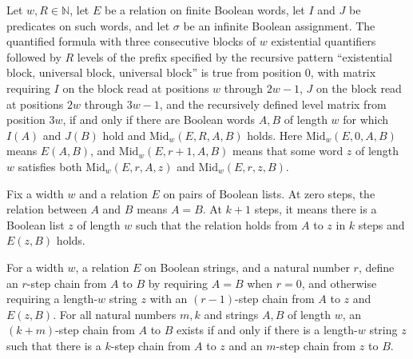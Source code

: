 \begin{theorem}
\label{Complexity.TQBFHard.prefixTruth_top}
\leanok
{}
Let $w,R\in\mathbb{N}$, let $E$ be a relation on finite Boolean words, let $I$ and $J$
be predicates on such words, and let $\sigma$ be an infinite Boolean assignment. The
quantified formula with three consecutive blocks of $w$ existential quantifiers followed
by $R$ levels of the prefix specified by the recursive pattern “existential block,
universal block, universal block” is true from position $0$, with matrix requiring $I$
on the block read at positions $w$ through $2w-1$, $J$ on the block read at positions
$2w$ through $3w-1$, and the recursively defined level matrix from position $3w$, if and
only if there are Boolean words $A,B$ of length $w$ for which $I(A)$ and $J(B)$ hold and
$\mathrm{Mid}_w(E,R,A,B)$ holds. Here $\mathrm{Mid}_w(E,0,A,B)$ means $E(A,B)$, and
$\mathrm{Mid}_w(E,r+1,A,B)$ means that some word $z$ of length $w$ satisfies both
$\mathrm{Mid}_w(E,r,A,z)$ and $\mathrm{Mid}_w(E,r,z,B)$.
\end{theorem}

\begin{definition}
\label{Complexity.TQBFHard.Steps}
\leanok
Fix a width $w$ and a relation $E$ on pairs of Boolean lists. At zero steps, the
relation between $A$ and $B$ means $A=B$. At $k+1$ steps, it means there is a Boolean
list $z$ of length $w$ such that the relation holds from $A$ to $z$ in $k$ steps and
$E(z,B)$ holds.
\end{definition}

\begin{theorem}
\label{Complexity.TQBFHard.steps_add}
\leanok
{}
For a width $w$, a relation $E$ on Boolean strings, and a natural number $r$, define an
$r$-step chain from $A$ to $B$ by requiring $A=B$ when $r=0$, and otherwise requiring a
length-$w$ string $z$ with an $(r-1)$-step chain from $A$ to $z$ and $E(z,B)$. For all
natural numbers $m,k$ and strings $A,B$ of length $w$, an $(k+m)$-step chain from $A$ to
$B$ exists if and only if there is a length-$w$ string $z$ such that there is a $k$-step
chain from $A$ to $z$ and an $m$-step chain from $z$ to $B$.
\end{theorem}

